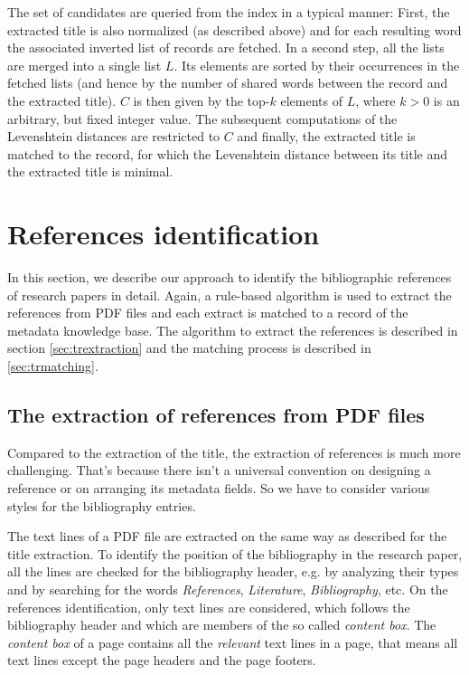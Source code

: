 The set of candidates are queried from the index in a typical manner: First, the extracted title is also normalized (as described above) and for each resulting word the associated inverted list of records are fetched. In a second step, all the lists are merged into a single list $L$. Its elements are sorted by their occurrences in the fetched lists (and hence by the number of shared words between the record and the extracted title). $C$ is then given by the top-$k$ elements of $L$, where $k>0$ is an arbitrary, but fixed integer value. The subsequent computations of the Levenshtein distances are restricted to $C$ and finally, the extracted title is matched to the record, for which the Levenshtein distance between its title and the extracted title is minimal.

\section{References identification} \label{sec:identification:references}
In this section, we describe our approach to identify the bibliographic references of research papers in detail. Again, a rule-based algorithm is used to extract the references from PDF files and each extract is matched to a record of the metadata knowledge base. The algorithm to extract the references is described in section \ref{sec:trextraction} and the matching process is described in \ref{sec:trmatching}.

\subsection{The extraction of references from PDF files}
Compared to the extraction of the title, the extraction of references is much more challenging. That's because there isn't a universal convention on designing a reference or on arranging its metadata fields. So we have to consider various styles for the bibliography entries. 

The text lines of a PDF file are extracted on the same way as described for the title extraction. To identify the position of the bibliography in the research paper, all the lines are checked for the bibliography header, e.g. by analyzing their types and by searching for the words \textit{References}, \textit{Literature}, \textit{Bibliography}, etc. 
On the references identification, only text lines are considered, which follows the bibliography header and which are members of the so called \textit{content box}. The \textit{content box} of a page contains all the \textit{relevant} text lines in a page, that means all text 
lines except the page headers and the page footers. 

